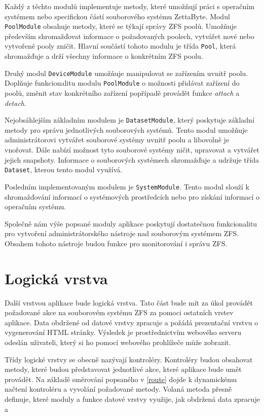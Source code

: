     Každý z těchto modulů implementuje metody, které umožňují práci s operačním systémem nebo specifickou částí souborového systému ZettaByte. Modul \verb|PoolModule| obsahuje metody, které se týkají správy ZFS poolů. Umožňuje především shromažďovat informace o požadovaných poolech, vytvářet nové nebo vytvořené pooly zničit. Hlavní součástí tohoto modulu je třída \verb|Pool|, která shromažďuje a drží všechny informace o konkrétním ZFS poolu.

    Druhý modul \verb|DeviceModule| umožňuje manipulovat se zařízením uvnitř poolu. Doplňuje funkcionalitu modulu \verb|PoolModule| o možnosti přidávat zařízení do poolů, změnit stav konkrétního zařízení popřípadě provádět funkce \emph{attach} a \emph{detach}.

    Nejobsáhlejším základním modulem je \verb|DatasetModule|, který poskytuje základní metody pro správu jednotlivých souborových systémů. Tento modul umožňuje administrátorovi vytvářet souborové systémy uvnitř poolu a libovolně je vnořovat. Dále nabízí možnost tyto souborové systémy ničit, upravovat a vytvářet jejich snapshoty. Informace o souborových systémech shromažďuje a udržuje třída \verb|Dataset|, kterou tento modul využívá.

    Posledním implementovaným modulem je \verb|SystemModule|. Tento modul slouží k shromažďování informací o systémových prostředcích nebo pro získání informací o operačním systému.

    Společně nám výše popsané moduly aplikace poskytují dostatečnou funkcionalitu pro vytvoření administrátorského nástroje nad souborovým systémem ZFS. Obsahem tohoto nástroje budou funkce pro monitorování i správu ZFS.
\section{Logická vrstva}
Další vrstvou aplikace bude logická vrstva. Tato část bude mít za úkol provádět požadované akce na souborovém systému ZFS za pomoci ostatních vrstev aplikace. Data obdržené od datové vrstvy zpracuje a požádá prezentační vrstvu o vygenerování HTML stránky. Výsledek je prostřednictvím webového serveru odeslán uživateli, který si ho pomocí webového prohlížeče může zobrazit.

Třídy logické vrstvy se obecně nazývají kontroléry. Kontroléry budou obsahovat metody, které budou představovat jednotlivé akce, které aplikace bude umět provádět. Na základě směrování popsaného v \ref{route} dojde k dynamickému načtení kontroléru a vyvolání požadované metody. Volaná metoda přesně definuje, které moduly a funkce datové vrstvy využije, jak obdržená data zpracuje a
